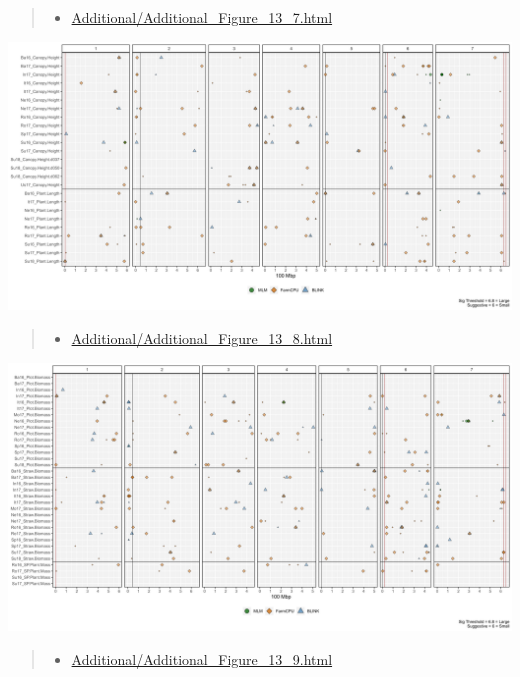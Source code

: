 \documentclass[
]{article}
\providecommand{\tightlist}{%
  \setlength{\itemsep}{0pt}\setlength{\parskip}{0pt}}
\begin{document}
\pagebreak

\begin{quote}
\begin{itemize}
\tightlist
\item
  \href{https://derekmichaelwright.github.io/AGILE_LDP_UAV/Additional/Additional_Figure_13_7.html}{Additional/Additional\_Figure\_13\_7.html}
\end{itemize}
\end{quote}

\includegraphics{Additional/Additional_Figure_13_7.png}

\begin{quote}
\begin{itemize}
\tightlist
\item
  \href{https://derekmichaelwright.github.io/AGILE_LDP_UAV/Additional/Additional_Figure_13_8.html}{Additional/Additional\_Figure\_13\_8.html}
\end{itemize}
\end{quote}

\includegraphics{Additional/Additional_Figure_13_8.png}

\pagebreak

\begin{quote}
\begin{itemize}
\tightlist
\item
  \href{https://derekmichaelwright.github.io/AGILE_LDP_UAV/Additional/Additional_Figure_13_9.html}{Additional/Additional\_Figure\_13\_9.html}
\end{itemize}
\end{quote}
\end{document}
